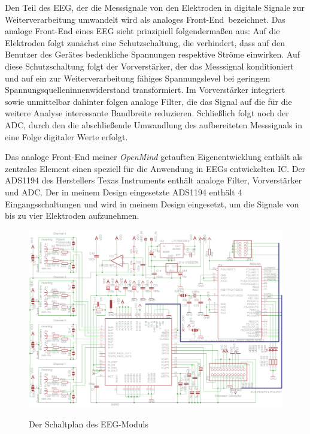\documentclass[12pt,a4paper,notitlepage]{article}
\begin{document}
Den Teil des \gls{EEG}, der die Messsignale von den Elektroden in digitale Signale zur Weiterverarbeitung umwandelt wird als \glqq analoges Front-End\grqq\ bezeichnet. Das analoge Front-End eines \gls{EEG} sieht prinzipiell folgendermaßen aus: Auf die Elektroden folgt zunächst eine Schutzschaltung, die verhindert, dass auf den Benutzer des Gerätes bedenkliche Spannungen respektive Ströme einwirken. Auf diese Schutzschaltung folgt der Vorverstärker, der das Messsignal konditioniert und auf ein zur Weiterverarbeitung fähiges Spannungslevel bei geringem Spannungsquelleninnenwiderstand transformiert. Im Vorverstärker integriert sowie unmittelbar dahinter folgen analoge Filter, die das Signal auf die für die weitere Analyse interessante Bandbreite reduzieren. Schließlich folgt noch der \gls{ADC}, durch den die abschließende Umwandlung des aufbereiteten Messsignals in eine Folge digitaler Werte erfolgt.

Das analoge Front-End meiner \emph{OpenMind} getauften Eigenentwicklung enthält als zentrales Element einen speziell für die Anwendung in \glspl{EEG} entwickelten \gls{IC}. Der ADS1194 des Herstellers Texas Instruments enthält analoge Filter, Vorverstärker und ADC\cite{TEXAS1}. Der in meinem Design eingesetzte ADS1194 enthält 4 Eingangsschaltungen und wird in meinem Design eingesetzt, um die Signale von bis zu vier Elektroden aufzunehmen.

\begin{landscape}
\begin{figure}
\includegraphics{images/adc_schematic_01.png}
\label{adc_schematic}
\caption{Der Schaltplan des EEG-Moduls}
\end{figure}
\end{landscape}
\end{document}
